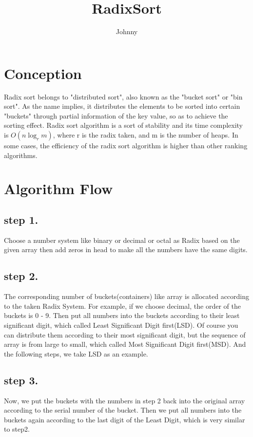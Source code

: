 \documentclass[11pt]{article}
\title{RadixSort}
\author{Johnny}
\begin{document}
    \maketitle
    \section{Conception}
    Radix sort belongs to "distributed sort", also known as the "bucket sort" or "bin sort".
    As the name implies, it distributes the elements to be sorted into certain "buckets" through partial information
    of the key value, so as to achieve the sorting effect.
    Radix sort algorithm is a sort of stability and its time complexity is $O(n\log_rm)$, where r is the radix taken,
    and m is the number of heaps.
    In some cases, the efficiency of the radix sort algorithm is higher than other ranking algorithms.

    \section{Algorithm Flow}
    \subsection{step 1.}
    Choose a number system like binary or decimal or octal as Radix based on the given array then add zeros in head to make
    all the numbers have the same digits.
    \subsection{step 2.}
    The corresponding number of buckets(containers) like array is allocated according to the taken Radix System.
    For example, if we choose decimal, the order of the buckets is 0 - 9.
    Then put all numbers into the buckets according to their least significant digit, which called Least Significant Digit first(LSD).
    Of course you can distribute them according to their most significant digit, but the sequence of array is from large to small,
    which called Most Significant Digit first(MSD).
    And the following steps, we take LSD as an example.
    \subsection{step 3.}
    Now, we put the buckets with the numbers in step 2 back into the original array according to the serial number of the bucket.
    Then we put all numbers into the buckets again according to the last digit of the Least Digit, which is very similar to step2.
\end{document}
